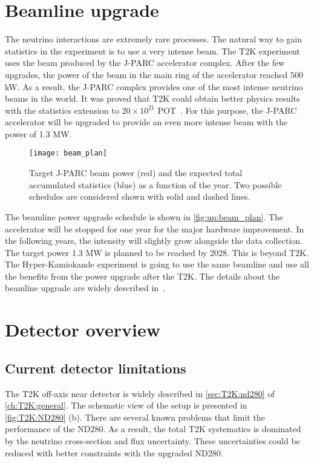 \documentclass[../main.tex]{subfiles}
\begin{document}
\section{Beamline upgrade}
\label{sec:up:beam}
The neutrino interactions are extremely rare processes. The natural way to gain statistics in the experiment is to use a very intense beam. The T2K experiment uses the beam produced by the J-PARC accelerator complex. After the few upgrades, the power of the beam in the main ring of the accelerator reached 500 kW. As a result, the J-PARC complex provides one of the most intense neutrino beams in the world. It was proved that T2K could obtain better physics results with the statistics extension to $20\times10^{21}$ POT~\cite{Abe2016e}. For this purpose, the J-PARC accelerator will be upgraded to provide an even more intense beam with the power of 1.3 MW.

\begin{figure}[!ht]
  \centering
  \texttt{[image: beam\_plan]}
  \caption{Target J-PARC beam power (red) and the expected total accumulated statistics (blue) as a function of the year. Two possible schedules are considered shown with solid and dashed lines.}
  \label{fig:up:beam_plan}
\end{figure}

The beamline power upgrade schedule is shown in \autoref{fig:up:beam_plan}. The accelerator will be stopped for one year for the major hardware improvement. In the following years, the intensity will slightly grow alongside the data collection. The target power 1.3 MW is planned to be reached by 2028. This is beyond T2K. The Hyper-Kamiokande experiment is going to use the same beamline and use all the benefits from the power upgrade after the T2K. The details about the beamline upgrade are widely described in~\cite{Abe2019h}.

\section{Detector overview}
\label{sec:up:nd}


\subsection{Current detector limitations}
The T2K off-axis near detector is widely described in \autoref{sec:T2K:nd280} of \autoref{ch:T2K:general}. The schematic view of the setup is presented in \autoref{fig:T2K:ND280} (b). There are several known problems that limit the performance of the ND280. As a result, the total T2K systematics is dominated by the neutrino cross-section and flux uncertainty. These uncertainties could be reduced with better constraints with the upgraded ND280.
\end{document}
